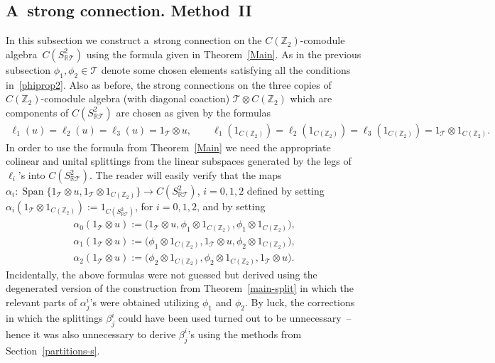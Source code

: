\documentclass[pdftex]{sigma}
\DeclareMathOperator{\Span}{Span}
\begin{document}
\subsection{A~strong connection. Method~II}

In this subsection we construct a~strong connection on the $C({\mathbb Z_2})$-comodule
algebra~${C(S^2_{\mathbb{R}\mathcal{T}})}$ using the formula given in Theorem~\ref{Main}.
As in the previous subsection $\phi_1,\phi_2\in{\mathcal{T}}$ denote some chosen elements satisfying all the conditions in~\eqref{phiprop2}.
Also as before, the strong connections on the three copies of $C({\mathbb Z_2})$-comodule algebra (with diagonal coaction)
${\mathcal{T}}\otimes C({\mathbb Z_2})$ which are components of ${C(S^2_{\mathbb{R}\mathcal{T}})}$ are chosen as given by the formulas
\begin{gather*}
\ell_1(u)=\ell_2(u)=\ell_3(u)=1_{\mathcal{T}}\otimes u,
\qquad
\ell_1(1_{C({\mathbb Z_2})})=\ell_2(1_{C({\mathbb Z_2})})=\ell_3(1_{C({\mathbb Z_2})})=1_{\mathcal{T}}\otimes 1_{C({\mathbb Z_2})}.
\end{gather*}
In order to use the formula from Theorem~\ref{Main} we need the appropriate colinear and unital
splittings from the linear subspaces generated by the legs of $\ell_i$'s into ${C(S^2_{\mathbb{R}\mathcal{T}})}$.
The reader will easily verify that the maps $\alpha_i:\Span\{1_{\mathcal{T}}\otimes u,1_{\mathcal{T}}\otimes
1_{C({\mathbb Z_2})}\}\rightarrow{C(S^2_{\mathbb{R}\mathcal{T}})}$, $i=0,1,2$ def\/ined by setting
$\alpha_i(1_{\mathcal{T}}\otimes 1_{C({\mathbb Z_2})}):=1_{{C(S^2_{\mathbb{R}\mathcal{T}})}}$, for $i=0,1,2$, and by setting
\begin{gather*}
\alpha_0(1_{\mathcal{T}}\otimes u) :=\big(1_{{\mathcal{T}}}\otimes u,\phi_1\otimes 1_{C({\mathbb Z_2})},\phi_1\otimes 1_{C({\mathbb Z_2})}\big),
\\
\alpha_1(1_{\mathcal{T}}\otimes u) :=\big(\phi_1\otimes 1_{C({\mathbb Z_2})},1_{{\mathcal{T}}}\otimes u,\phi_2\otimes 1_{C({\mathbb Z_2})}\big),
\\
\alpha_2(1_{\mathcal{T}}\otimes u) :=\big(\phi_2\otimes 1_{C({\mathbb Z_2})},\phi_2\otimes 1_{C({\mathbb Z_2})},1_{{\mathcal{T}}}\otimes u\big).
\end{gather*}
Incidentally, the above formulas were not guessed but derived using the degenerated version of the construction from
Theorem~\ref{main-split} in which the relevant parts of $\alpha^i_j$'s were obtained utilizing $\phi_1$ and $\phi_2$.
By luck, the corrections in which the splittings $\beta^i_j$ could have been used turned out to be unnecessary~-- hence
it was also unnecessary to derive $\beta^i_j$'s using the methods from Section~\ref{partitions-s}.
\end{document}
